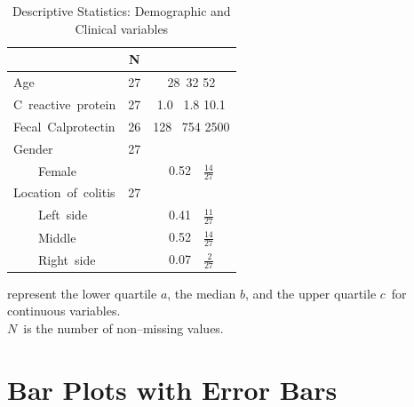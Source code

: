 \begin{table}[!h]
 \caption{Descriptive Statistics: Demographic and Clinical variables\label{summ1}}
 \begin{center}
 \begin{tabular}{lrc}\hline\hline
\multicolumn{1}{l}{}&
\multicolumn{1}{c}{N}&
\multicolumn{1}{c}{ }
\\ \hline
Age&27&{\scriptsize 28~}{32 }{\scriptsize 52} \\
C~reactive~protein&27&{\scriptsize  1.0~}{ 1.8 }{\scriptsize 10.1} \\
Fecal~Calprotectin &26&{\scriptsize  128~}{ 754 }{\scriptsize 2500} \\
Gender&27&\\
~~~~Female&&0.52~{\scriptsize~$\frac{14}{27}$}\\
Location~of~colitis&27&\\
~~~~Left~side&&0.41~{\scriptsize~$\frac{11}{27}$}\\
~~~~Middle&&0.52~{\scriptsize~$\frac{14}{27}$}\\
~~~~Right~side&&0.07~{\scriptsize~$\frac{~2}{27}$}\\
\hline
\end{tabular}

\end{center}

 represent the lower quartile $a$, the median $b$, and the upper quartile $c$\ for continuous variables.\\
$N$\ is the number of non--missing values.\\

\end{table}
\clearpage
\section{Bar Plots with Error Bars}

